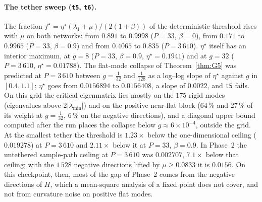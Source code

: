 \documentclass[11pt]{article}
\theoremstyle{remark}
\begin{document}
\paragraph{The tether sweep (\texttt{t5}, \texttt{t6}).} The fraction $f^\star=\eta^\star(\lambda_1+\mu)/(2(1+\beta))$ of the deterministic threshold rises with $\mu$ on both networks: from $0.891$ to $0.9998$ ($P=33$, $\beta=0$), from $0.171$ to $0.9965$ ($P=33$, $\beta=0.9$) and from $0.4065$ to $0.835$ ($P=3\,610$). $\eta^\star$ itself has an interior maximum, at $g=8$ ($P=33$, $\beta=0.9$, $\eta^\star=0.1941$) and at $g=32$ ($P=3\,610$, $\eta^\star=0.01788$). The flat-mode collapse of Theorem~\ref{thm:G5} was predicted at $P=3\,610$ between $g=\frac1{32}$ and $\frac1{128}$ as a log--log slope of $\eta^\star$ against $g$ in $[0.4,1.1]$; $\eta^\star$ goes from $0.0156894$ to $0.0156408$, a slope of $0.0022$, and \texttt{t5} fails. On this grid the critical eigenmatrix lies mostly on the $175$ rigid modes (eigenvalues above $2|\lambda_{\min}|$) and on the positive near-flat block ($64\,\%$ and $27\,\%$ of its weight at $g=\frac1{32}$, $6\,\%$ on the negative directions), and a diagonal upper bound computed after the run places the collapse below $g\approx6\times10^{-4}$, outside the grid. At the smallest tether the threshold is $1.23\times$ below the one-dimensional ceiling ($0.019278$) at $P=3\,610$ and $2.11\times$ below it at $P=33$, $\beta=0.9$. In Phase~2 the untethered sample-path ceiling at $P=3\,610$ was $0.002707$, $7.1\times$ below that ceiling; with the $1\,528$ negative directions lifted by $\mu\ge0.0833$ it is $0.0156$. On this checkpoint, then, most of the gap of Phase~2 comes from the negative directions of $H$, which a mean-square analysis of a fixed point does not cover, and not from curvature noise on positive flat modes.
\end{document}
